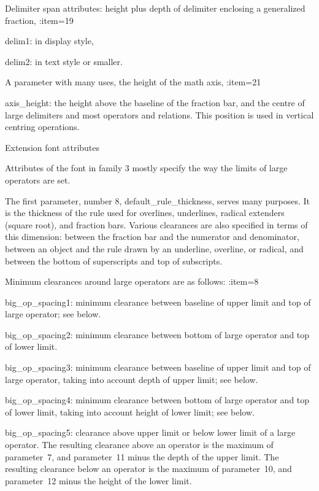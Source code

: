 Delimiter span attributes: height plus depth of delimiter enclosing
a generalized fraction,
\enumerate \SetCounter:item=19
\item delim1:
in display style,
\item delim2:
in text style or smaller.
\>

A parameter with many uses, the height of the math axis,
\enumerate \SetCounter:item=21
\item axis\_height:
the height above the baseline
of the fraction bar, and the centre of large delimiters
and most operators and relations. This position is
used in vertical centring operations.
\>

\spoint Extension font attributes

Attributes of the font in family 3 mostly specify
the way the limits of large operators are set.

The first parameter, number 8, default\_rule\_thickness,
serves many purposes. It
is the thickness of the rule used for overlines,
underlines, radical extenders (square root), 
and fraction bars. Various clearances are  also specified
in terms of this dimension: between the fraction bar and
the numerator and denominator, between an object and
the rule drawn by an underline, overline, or radical,
and between the bottom of superscripts and top of subscripts.

Minimum clearances around large operators are as follows:
\enumerate \SetCounter:item=8
\item big\_op\_spacing1:
minimum clearance between baseline of upper limit and top
of large operator; see below.
\item big\_op\_spacing2:
minimum clearance between bottom of large operator and top of 
lower limit.
\item big\_op\_spacing3:
minimum clearance between baseline of
upper limit and top of large operator,
taking into account depth of upper limit; see below.
\item big\_op\_spacing4:
minimum clearance between bottom of large operator and top of lower
limit, taking into account height of lower limit; see below.
\item big\_op\_spacing5:
clearance above upper limit or below lower limit of a large operator.
\>
The resulting clearance above an operator is the maximum
of parameter~7, and parameter~11 minus the depth of the
upper limit.
The resulting clearance below an operator is the maximum
of parameter~10, and parameter~12 minus the height of the
lower limit.


